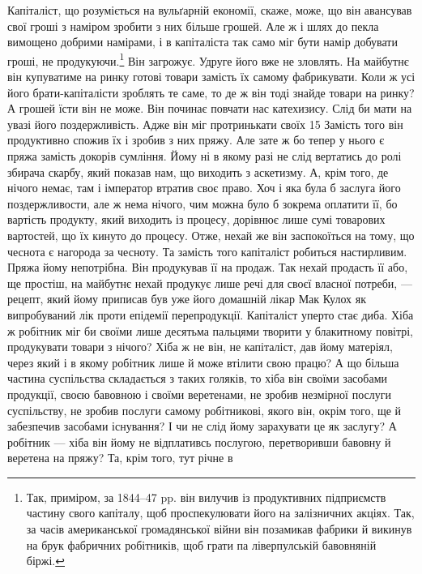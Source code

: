 Капіталіст, що розуміється на вульґарній економії, скаже,
може, що він авансував свої гроші з наміром зробити з них більше
грошей. Але ж і шлях до пекла вимощено добрими намірами, і в
капіталіста так само міг бути намір добувати гроші, не продукуючи.\footnote{
Так, приміром, за 1844--47 pp. він вилучив із продуктивних підприємств
частину свого капіталу, щоб проспекулювати його на залізничних
акціях. Так, за часів американської громадянської війни він позамикав
фабрики й викинув на брук фабричних робітників, щоб грати па ліверпулській
бавовняній біржі.
} Він загрожує. Удруге його вже
не зловлять. На майбутнє
він купуватиме на ринку готові товари замість їх самому
фабрикувати. Коли ж усі його брати-капіталісти зроблять те
саме, то де ж він тоді знайде товари на ринку? А грошей їсти
він не може. Він починає повчати нас катехизису. Слід би мати
на увазі його поздержливість. Адже він міг протринькати своїх
15 Замість того він продуктивно спожив їх і зробив
з них пряжу. Але зате ж бо тепер у нього є пряжа замість докорів
сумління. Йому ні в якому разі не слід вертатись до ролі
збирача скарбу, який показав нам, що виходить з аскетизму.
А, крім того, де нічого немає, там і імператор втратив своє право.
Хоч і яка була б заслуга його поздержливости, але ж нема нічого,
чим можна було б зокрема оплатити її, бо вартість продукту,
який виходить із процесу, дорівнює лише сумі товарових вартостей,
що їх кинуто до процесу. Отже, нехай же він заспокоїться
на тому, що чеснота є нагорода за чесноту. Та замість того капіталіст
робиться настирливим. Пряжа йому непотрібна. Він продукував
її на продаж. Так нехай продасть її або, ще простіш, на
майбутнє нехай продукує лише речі для своєї власної потреби, —
рецепт, який йому приписав був уже його домашній лікар Мак
Кулох як випробуваний лік проти епідемії перепродукції. Капіталіст
уперто стає диба. Хіба ж робітник міг би своїми лише
десятьма пальцями творити у блакитному повітрі, продукувати
товари з нічого? Хіба ж не він, не капіталіст, дав йому матеріял,
через який і в якому робітник лише й може втілити свою працю?
А що більша частина суспільства складається з таких голяків,
то хіба він своїми засобами продукції, своєю бавовною і своїми
веретенами, не зробив незмірної послуги суспільству, не зробив
послуги самому робітникові, якого він, окрім того, ще й забезпечив
засобами існування? І чи не слід йому зарахувати це як заслугу?
А робітник — хіба він йому не відплативсь послугою, перетворивши
бавовну й веретена на пряжу? Та, крім того, тут річне в
